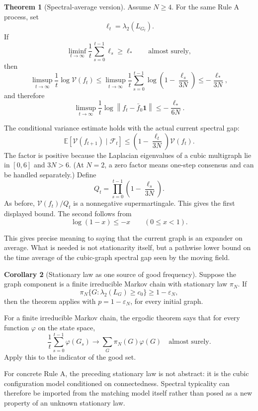 \documentclass[11pt]{article}
\makeatletter
\newcommand{\E}{\mathbb E}
\newcommand{\V}{\mathcal V}
\newcommand{\one}{\mathbf 1}
\newcommand{\norm}[1]{\left\|#1\right\|}
\theoremstyle{definition}
\newtheorem{theorem}{Theorem}
\newtheorem{corollary}[theorem]{Corollary}
\renewenvironment{proof}[1][\proofname]{\par
  \pushQED{\qed}%
  \normalfont \topsep6\p@\@plus6\p@\relax
  \trivlist
  \item[\hskip\labelsep\bfseries #1\@addpunct{.}]\ignorespaces
}{%
  \popQED\endtrivlist\@endpefalse
}
\makeatother
\begin{document}
\begin{theorem}[Spectral-average version]
Assume $N\ge4$.  For the same Rule A process, set
\[
    \ell_t=\lambda_2(L_{G_t}).
\]
If
\[
    \liminf_{t\to\infty}\frac1t\sum_{s=0}^{t-1}\ell_s\ge \ell_*
    \qquad\text{almost surely},
\]
then
\[
    \limsup_{t\to\infty}\frac1t\log\V(f_t)
    \le
    \limsup_{t\to\infty}\frac1t
    \sum_{s=0}^{t-1}\log\left(1-\frac{\ell_s}{3N}\right)
    \le
    -\frac{\ell_*}{3N},
\]
and therefore
\[
    \limsup_{t\to\infty}
    \frac1t\log\norm{f_t-\bar f_0\one}
    \le
    -\frac{\ell_*}{6N}.
\]
\end{theorem}

\begin{proof}
The conditional variance estimate holds with the actual current spectral gap:
\[
    \E[\V(f_{t+1})\mid\mathcal F_t]
    \le
    \left(1-\frac{\ell_t}{3N}\right)\V(f_t).
\]
The factor is positive because the Laplacian eigenvalues of a cubic multigraph
lie in $[0,6]$ and $3N>6$.  (At $N=2$, a zero factor means one-step consensus
and can be handled separately.)  Define
\[
    Q_t=\prod_{s=0}^{t-1}\left(1-\frac{\ell_s}{3N}\right).
\]
As before, $\V(f_t)/Q_t$ is a nonnegative supermartingale.  This gives the
first displayed bound.  The second follows from
\[
    \log(1-x)\le -x
    \qquad (0\le x<1).
\]
\end{proof}

This gives precise meaning to saying that the current graph is an expander on
average.  What is needed is not stationarity itself, but a pathwise lower
bound on the time average of the cubic-graph spectral gap seen by the moving
field.

\begin{corollary}[Stationary law as one source of good frequency]
Suppose the graph component is a finite irreducible Markov chain with
stationary law $\pi_N$.  If
\[
    \pi_N\{G:\lambda_2(L_G)\ge c_0\}\ge 1-\varepsilon_N,
\]
then the theorem applies with $p=1-\varepsilon_N$, for every initial graph.
\end{corollary}

\begin{proof}
For a finite irreducible Markov chain, the ergodic theorem says that for every
function $\varphi$ on the state space,
\[
    \frac1t\sum_{s=0}^{t-1}\varphi(G_s)
    \to
    \sum_G\pi_N(G)\varphi(G)
    \quad\text{almost surely}.
\]
Apply this to the indicator of the good set.
\end{proof}

For concrete Rule A, the preceding stationary law is not abstract: it is the
cubic configuration model conditioned on connectedness.  Spectral typicality
can therefore be imported from the matching model itself rather than posed as
a new property of an unknown stationary law.
\end{document}
